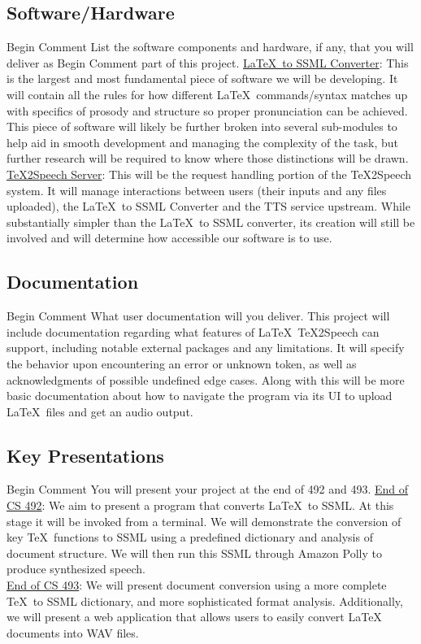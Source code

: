                                                                                                                                                                                                                                                                                                                                                                                                                                                                                                                                                                                                                                                                                                                                                                                                                                                                                                                                                                                                                                                                                                                                                                                                                                                                                                                                                                                                                                                                                                                                                                                                                                                                                                                                                                                                                                                                                                                                                                                                                                                                                                                                                                                                                                                                                                                                                                                                                                                                                                                                                                                                                                                                                                                                                                                                                                                                                                                                                                                                                                                                                                                                                                                                                                                                                                                                                                                                                                                                                                                                                                                                                                                                                                                                                                                                                                                                                                                                                                                                                                                                                                                                                                                                                                                                                                                                                                                                                                                                                                                                                                                                                                                                                                                                                                                                                                                                                                                                                                                                                                                                                                                                                                                                                                                                                                                                                                                                                                                                                                                                                                                                                                                                                                                                                                                                                                                                                                                                                                                                                                                                                                                                                                                                                                                                                                                                                                                                                                                                                                                                                                                                                                                                                                                                                                                                                                                                                                                                                                                                                                                                                                                                                                                                                                                                                                                                                                                                                                                                                                                                                                                                                                                                                                                                                                                                                                                                                                                                                                                                                                                                                                                                                                                                                                                                                                                                                                                                                                                                                                                                                                                                                                                                                                                                                                                                                                                                                                                                                                                                                                                                                                                                                                                                                                                                                                                                                                                                                                                                                                                                                                                                                                                                                                                                                                                                                                                                                                                                                                                                                                                                                                                                                                                                                                                                                                                                                                                                                                                                                                                                                                                                                                                                                                                                                                                                                                                                                                                                                                                                                                                                                                                                                                                                                                                                                                                                                                                                                                                                                                                                                                                                                            \documentclass[letterpaper,12pt]{article}
\begin{document}
\subsection{Software/Hardware}
Begin Comment  List the software components and hardware, if any, that you will deliver as
Begin Comment  part of this project.  
\underline{\LaTeX\ to SSML Converter}: This is the largest and most fundamental piece of software we will be developing. It will contain all the rules for how different \LaTeX\ commands/syntax matches up with specifics of prosody and structure so proper pronunciation can be achieved. This piece of software will likely be further broken into several sub-modules to help aid in smooth development and managing the complexity of the task, but further research will be required to know where those distinctions will be drawn.\\
\newline
\underline{\TeX 2Speech Server}: This will be the request handling portion of the \TeX 2Speech system. It will manage interactions between users (their inputs and any files uploaded), the \LaTeX\ to SSML Converter and the TTS service upstream. While substantially simpler than the \LaTeX\ to SSML converter, its creation will still be involved and will determine how accessible our software is to use.

\subsection{Documentation}
Begin Comment  What user documentation will you deliver.
This project will include documentation regarding what features of \LaTeX\ \TeX 2Speech can support, including notable external packages and any limitations. It will specify the behavior upon encountering an error or unknown token, as well as acknowledgments of possible undefined edge cases. Along with this will be more basic documentation about how to navigate the program via its UI to upload \LaTeX\ files and get an audio output.

\subsection{Key Presentations}
Begin Comment  You will present your project at the end of 492 and 493.
\underline{End of CS 492}: We aim to present a program that converts \LaTeX\ to SSML. At this stage it will be invoked from a terminal. We will demonstrate the conversion of key \TeX\ functions to SSML using a predefined dictionary and analysis of document structure. We will then run this SSML through Amazon Polly to produce synthesized speech. \\
\newline
\underline{End of CS 493}: We will present document conversion using a more complete \TeX\ to SSML dictionary, and more sophisticated format analysis. Additionally, we will present a web application that allows users to easily convert LaTeX documents into WAV files.
\end{document}
